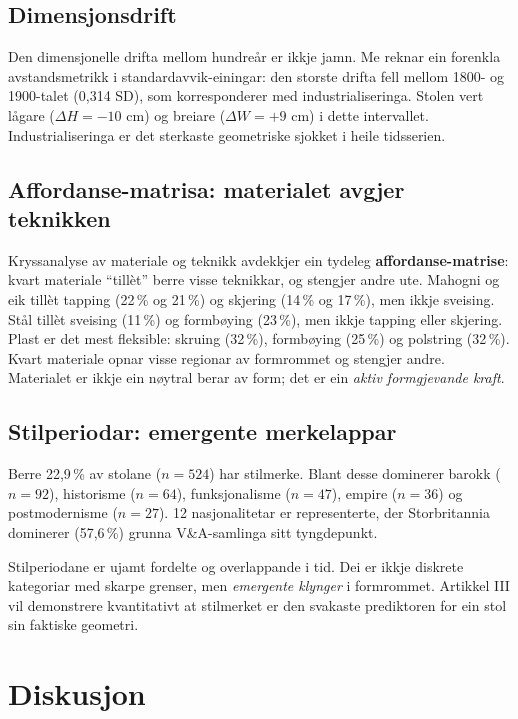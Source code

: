 \documentclass[10pt, a4paper, twocolumn]{article}
\begin{document}
\subsection{Dimensjonsdrift}

Den dimensjonelle drifta mellom hundreår er ikkje jamn. Me reknar ein forenkla avstandsmetrikk i standardavvik-einingar: den storste drifta fell mellom 1800- og 1900-talet (0,314 SD), som korresponderer med industrialiseringa. Stolen vert lågare ($\Delta H = -10$ cm) og breiare ($\Delta W = +9$ cm) i dette intervallet. Industrialiseringa er det sterkaste geometriske sjokket i heile tidsserien.

\subsection{Affordanse-matrisa: materialet avgjer teknikken}

Kryssanalyse av materiale og teknikk avdekkjer ein tydeleg \textbf{affordanse-matrise}: kvart materiale ``tillèt'' berre visse teknikkar, og stengjer andre ute. Mahogni og eik tillèt tapping (22\,\% og 21\,\%) og skjering (14\,\% og 17\,\%), men ikkje sveising. Stål tillèt sveising (11\,\%) og formbøying (23\,\%), men ikkje tapping eller skjering. Plast er det mest fleksible: skruing (32\,\%), formbøying (25\,\%) og polstring (32\,\%). Kvart materiale opnar visse regionar av formrommet og stengjer andre. Materialet er ikkje ein nøytral berar av form; det er ein \emph{aktiv formgjevande kraft}.

\subsection{Stilperiodar: emergente merkelappar}

Berre 22,9\,\% av stolane ($n = 524$) har stilmerke. Blant desse dominerer barokk ($n = 92$), historisme ($n = 64$), funksjonalisme ($n = 47$), empire ($n = 36$) og postmodernisme ($n = 27$). 12 nasjonalitetar er representerte, der Storbritannia dominerer (57,6\,\%) grunna V\&A-samlinga sitt tyngdepunkt.

Stilperiodane er ujamt fordelte og overlappande i tid. Dei er ikkje diskrete kategoriar med skarpe grenser, men \emph{emergente klynger} i formrommet. Artikkel III vil demonstrere kvantitativt at stilmerket er den svakaste prediktoren for ein stol sin faktiske geometri.


\section{Diskusjon}
\end{document}
